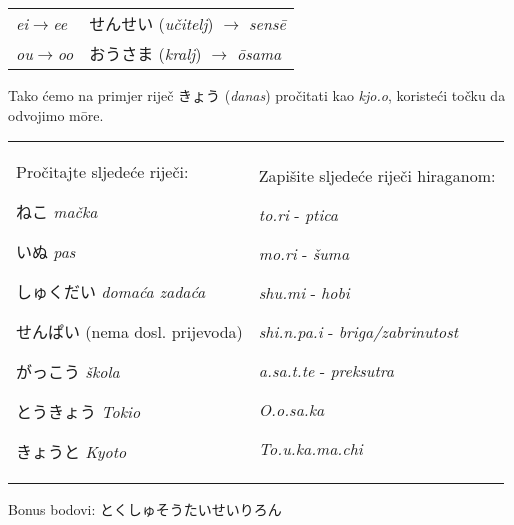 	\vspace{5pt}
	\begin{tabular}{l l}
		\textit{ei}$\rightarrow$\textit{ee} & せんせい (\textit{učitelj}) $\rightarrow$ \textit{sens\={e}}\\
		\textit{ou}$\rightarrow$\textit{oo} & おうさま (\textit{kralj}) $\rightarrow$ \textit{\={o}sama}\\
	\end{tabular}

	\vspace{5pt}
	Tako ćemo na primjer riječ きょう (\textit{danas}) pročitati kao \textit{kjo.o}, koristeći točku da odvojimo m\={o}re.
	
	
	\begin{tabular}{p{200pt} p{200pt}}
		\begin{mondai}{Pročitajte sljedeće riječi:}
			\item ねこ \textit{mačka}
			\item いぬ \textit{pas}
			\item しゅくだい \textit{domaća zadaća}
			\item せんぱい (nema dosl. prijevoda)
			\item がっこう \textit{škola}
			\item とうきょう \textit{Tokio}
			\item きょうと \textit{Kyoto}
		\end{mondai}
		&
		\begin{mondai}{Zapišite sljedeće riječi hiraganom:}
			\item \textit{to.ri} - \textit{ptica}
			\item \textit{mo.ri} - \textit{šuma}
			\item \textit{shu.mi} - \textit{hobi}
			\item \textit{shi.n.pa.i} - \textit{briga/zabrinutost}
			\item \textit{a.sa.t.te} - \textit{preksutra}
			\item \textit{O.o.sa.ka}
			\item \textit{To.u.ka.ma.chi}
		\end{mondai}\\
	\end{tabular}
	
	Bonus bodovi: とくしゅそうたいせいりろん
	

